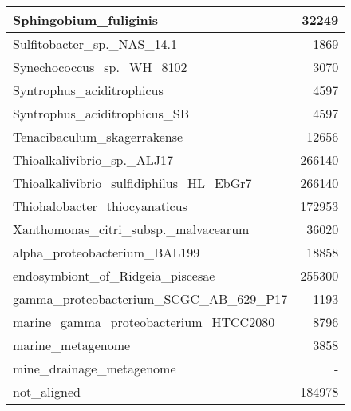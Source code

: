 \documentclass[12pt,a4paper]{article}
\begin{document}
\begin{table}[ht]
\begin{center}
\begin{tabular}{|l*{1}{|r}|}
Sphingobium\_fuliginis & 32249 \\ \hline
Sulfitobacter\_sp.\_NAS\_14.1 & 1869 \\ \hline
Synechococcus\_sp.\_WH\_8102 & 3070 \\ \hline
Syntrophus\_aciditrophicus & 4597 \\ \hline
Syntrophus\_aciditrophicus\_SB & 4597 \\ \hline
Tenacibaculum\_skagerrakense & 12656 \\ \hline
Thioalkalivibrio\_sp.\_ALJ17 & 266140 \\ \hline
Thioalkalivibrio\_sulfidiphilus\_HL\_EbGr7 & 266140 \\ \hline
Thiohalobacter\_thiocyanaticus & 172953 \\ \hline
Xanthomonas\_citri\_subsp.\_malvacearum & 36020 \\ \hline
alpha\_proteobacterium\_BAL199 & 18858 \\ \hline
endosymbiont\_of\_Ridgeia\_piscesae & 255300 \\ \hline
gamma\_proteobacterium\_SCGC\_AB\_629\_P17 & 1193 \\ \hline
marine\_gamma\_proteobacterium\_HTCC2080 & 8796 \\ \hline
marine\_metagenome & 3858 \\ \hline
mine\_drainage\_metagenome & - \\ \hline
not\_aligned & 184978 \\ \hline
\end{tabular}
\end{center}
\end{table}
\end{document}
